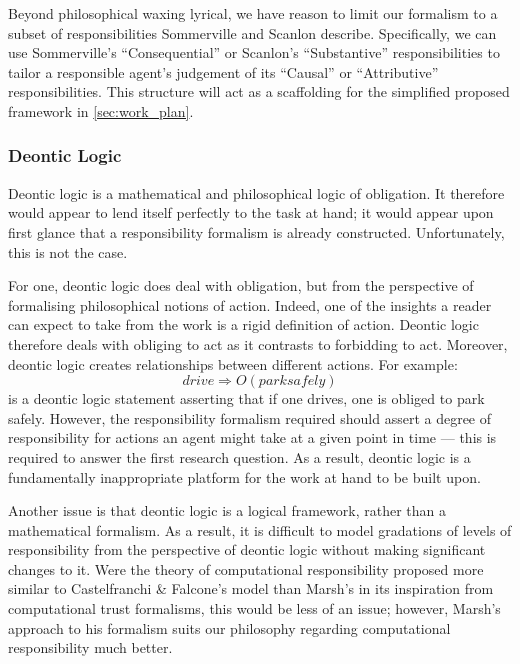 Beyond philosophical waxing lyrical, we have reason to limit our formalism to a subset of responsibilities Sommerville and Scanlon describe. Specifically, we can use Sommerville's ``Consequential'' or Scanlon's ``Substantive'' responsibilities to tailor a responsible agent's judgement of its ``Causal'' or ``Attributive'' responsibilities. This structure will act as a scaffolding for the simplified proposed framework in \cref{sec:work_plan}.

\subsubsection{Deontic Logic}
Deontic logic is a mathematical and philosophical logic of obligation. \parencite{deontic-logic} It therefore would appear to lend itself perfectly to the task at hand; it would appear upon first glance that a responsibility formalism is already constructed. Unfortunately, this is not the case.\par

For one, deontic logic does deal with obligation, but from the perspective of formalising philosophical notions of action. Indeed, one of the insights a reader can expect to take from the work is a rigid definition of action. Deontic logic therefore deals with obliging to act as it contrasts to forbidding to act. Moreover, deontic logic creates relationships between different actions. For example: \[drive \Rightarrow O(park safely)\] is a deontic logic statement asserting that if one drives, one is obliged to park safely. However, the responsibility formalism required should assert a degree of responsibility for actions an agent might take at a given point in time --- this is required to answer the first research question. As a result, deontic logic is a fundamentally inappropriate platform for the work at hand to be built upon.\par

Another issue is that deontic logic is a logical framework, rather than a mathematical formalism. As a result, it is difficult to model gradations of levels of responsibility from the perspective of deontic logic without making significant changes to it. Were the theory of computational responsibility proposed more similar to Castelfranchi \& Falcone's model than Marsh's in its inspiration from computational trust formalisms, this would be less of an issue; however, Marsh's approach to his formalism suits our philosophy regarding computational responsibility much better.\par


